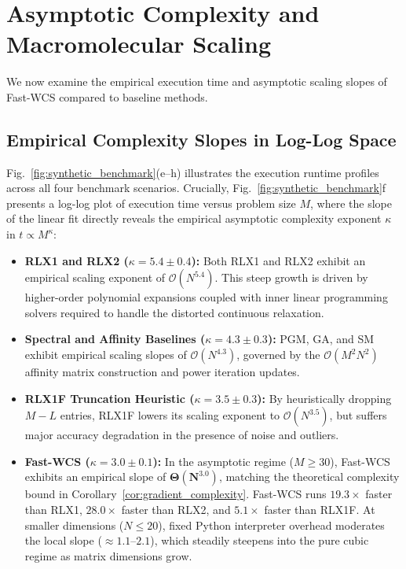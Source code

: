 \documentclass[conference]{IEEEtran}
\begin{document}
\section{Asymptotic Complexity and Macromolecular Scaling}
\label{sec:scaling_benchmark}

We now examine the empirical execution time and asymptotic scaling slopes of Fast-WCS compared to baseline methods.

\subsection{Empirical Complexity Slopes in Log-Log Space}

Fig.~\ref{fig:synthetic_benchmark}(e--h) illustrates the execution runtime profiles across all four benchmark scenarios. Crucially, Fig.~\ref{fig:synthetic_benchmark}f presents a log-log plot of execution time versus problem size $M$, where the slope of the linear fit directly reveals the empirical asymptotic complexity exponent $\kappa$ in $t \propto M^\kappa$:

\begin{itemize}
    \item \textbf{RLX1 and RLX2 ($\kappa = 5.4 \pm 0.4$):} Both RLX1 and RLX2 exhibit an empirical scaling exponent of $\mathcal{O}(N^{5.4})$. This steep growth is driven by higher-order polynomial expansions coupled with inner linear programming solvers required to handle the distorted continuous relaxation.
    \item \textbf{Spectral and Affinity Baselines ($\kappa = 4.3 \pm 0.3$):} PGM, GA, and SM exhibit empirical scaling slopes of $\mathcal{O}(N^{4.3})$, governed by the $\mathcal{O}(M^2 N^2)$ affinity matrix construction and power iteration updates.
    \item \textbf{RLX1F Truncation Heuristic ($\kappa = 3.5 \pm 0.3$):} By heuristically dropping $M - L$ entries, RLX1F lowers its scaling exponent to $\mathcal{O}(N^{3.5})$, but suffers major accuracy degradation in the presence of noise and outliers.
    \item \textbf{Fast-WCS ($\kappa = 3.0 \pm 0.1$):} In the asymptotic regime ($M \ge 30$), Fast-WCS exhibits an empirical slope of $\mathbf{\Theta(N^{3.0})}$, matching the theoretical complexity bound in Corollary~\ref{cor:gradient_complexity}. Fast-WCS runs $19.3\times$ faster than RLX1, $28.0\times$ faster than RLX2, and $5.1\times$ faster than RLX1F. At smaller dimensions ($N \le 20$), fixed Python interpreter overhead moderates the local slope ($\approx 1.1\text{--}2.1$), which steadily steepens into the pure cubic regime as matrix dimensions grow.
\end{itemize}
\end{document}
